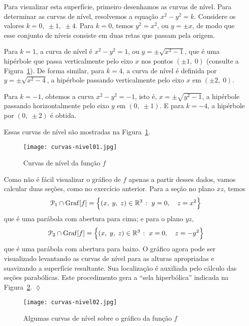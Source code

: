 \solo
Para visualizar esta superfície, primeiro desenhamos as curvas de nível. Para determinar as curvas de nível, resolvemos a equação \(x^{2}-y^{2} = k\). Considere os valores \(k = 0,\; \pm 1,\;  \pm 4\). Para \(k=0\), temos \(y^{2}=x^{2}\), ou \(y = \pm x\), de modo que esse conjunto de níveis consiste em duas  retas que passam pela origem.

Para \(k=1\), a curva de nível é \(x^{2}-y^{2} = 1\), ou \(y=\pm \sqrt{x^{2}-1}\), que é uma hipérbole que passa verticalmente pelo eixo \(x\) nos pontos \((\pm 1,\; 0)\) 
(consulte a Figura~\ref{fig:2-1-9}). De forma similar, para \(k =4\), a curva de nível é definida por \(y= \pm \sqrt{x^{2}-4}\), a hipérbole passando verticalmente pelo eixo \(x\) 
em \((\pm 2,\; 0)\). 


Para \(k =-1\), obtemos a curva \(x^{2}-y^{2}=-1\), isto é, \(x= \pm \sqrt{y^{2}-1}\), a hipérbole passando horizontalmente pelo eixo \(y\) em \((0,\; \pm 1)\). E para \(k =-4\), a hipérbole 
por \((0,\; \pm 2)\) é obtida.

Essas curvas de nível são mostradas na Figura~\ref{fig:2-1-9}. 
% 
\begin{figure}[H]
	\centering
	\texttt{[image: curvas-nivel01.jpg]}
	\caption{Curvas de nível da função \(f\)}
	\label{fig:2-1-9}
\end{figure}
%

Como não é fácil visualizar o gráfico de \(f\) apenas a partir desses dados, vamos calcular duas seções, como no exercício  anterior. Para a seção no plano \(xz\), temos
\begin{equation*}
	\mathcal{P}_{1} \cap \mathrm{Graf}[f] = \Bigl\{(x,\; y,\; z) \in \mathbb{R}^{3}\; \colon\; y=0,\quad z= x^{2}\Bigr\}
\end{equation*}
que é uma parábola com abertura para cima; e para o plano \(yz\),
\begin{equation*}
	\mathcal{P}_{2} \cap \mathrm{Graf}[f] = \Bigl\{(x,\; y,\; z) \in \mathbb{R}^{3}\; \colon\; x=0,\quad z= -y^{2}\Bigr\}
\end{equation*}
que é uma parábola com abertura para baixo. O gráfico agora pode ser visualizado levantando as curvas de nível para as alturas apropriadas e suavizando a superfície resultante. Sua 
localização é auxiliada pelo cálculo das seções parabólicas. Este procedimento gera a ``sela hiperbólica'' indicada na Figura~\ref{fig:2-1-10}. \hfill \(\lozenge\)
%
\begin{figure}[H]
	\centering
	\texttt{[image: curvas-nivel02.jpg]}
	\caption{Algumas curvas de nível sobre o gráfico da função \(f\)}
	\label{fig:2-1-10}
\end{figure}
%


